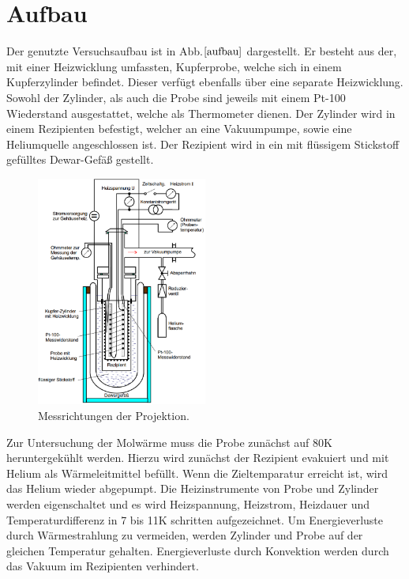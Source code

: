 \section{Aufbau}
Der genutzte Versuchsaufbau ist in Abb.$\ref{aufbau}$ dargestellt. Er besteht aus der, mit einer Heizwicklung umfassten, Kupferprobe, welche sich in einem Kupferzylinder befindet. Dieser verfügt ebenfalls über eine
separate Heizwicklung. Sowohl der Zylinder, als auch die Probe sind jeweils mit einem Pt-100 Wiederstand ausgestattet, welche als Thermometer dienen. Der Zylinder wird in einem Rezipienten befestigt, welcher an eine
Vakuumpumpe, sowie eine Heliumquelle angeschlossen ist. Der Rezipient wird in ein mit flüssigem Stickstoff gefülltes Dewar-Gefäß gestellt.

\begin{figure}[H]
  \centering
  \includegraphics[width=0.5\textwidth]{Bilder/aufbau.png}
  \caption{Messrichtungen der Projektion.}
  \label{aufbau}
\end{figure}
Zur Untersuchung der Molwärme muss die Probe zunächst auf 80K heruntergekühlt werden. Hierzu wird zunächst der Rezipient evakuiert und mit Helium als Wärmeleitmittel befüllt. Wenn die Zieltemparatur erreicht ist, wird das Helium wieder
abgepumpt. Die Heizinstrumente von Probe und Zylinder werden eigenschaltet und es wird Heizspannung, Heizstrom, Heizdauer und Temperaturdifferenz in 7 bis 11K schritten aufgezeichnet. Um Energieverluste durch
Wärmestrahlung zu vermeiden, werden Zylinder und Probe auf der gleichen Temperatur gehalten. Energieverluste durch Konvektion werden durch das Vakuum im Rezipienten verhindert.
